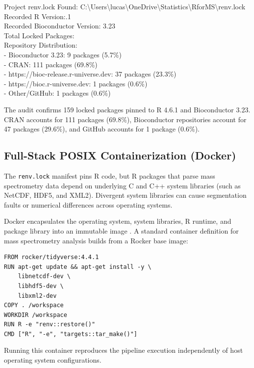 \documentclass[11pt,twoside,openright]{book}
\begin{document}
\begin{routput}
Project renv.lock Found: C:\textbackslash Users\textbackslash lucas\textbackslash OneDrive\textbackslash Statistics\textbackslash RforMS\textbackslash renv.lock\\
\enspace\enspace Recorded R Version:\enspace\enspace\enspace\enspace\enspace\enspace\enspace\enspace\enspace\enspace\enspace{}.1\\
\enspace\enspace Recorded Bioconductor Version: 3.23\\
\enspace\enspace Total Locked Packages:\enspace\enspace\enspace\enspace\enspace\enspace\enspace\enspace{}\\
\enspace\enspace Repository Distribution:\\
\enspace\enspace\enspace\enspace - Bioconductor 3.23: 9 packages (5.7\%)\\
\enspace\enspace\enspace\enspace - CRAN: 111 packages (69.8\%)\\
\enspace\enspace\enspace\enspace - https://bioc-release.r-universe.dev: 37 packages (23.3\%)\\
\enspace\enspace\enspace\enspace - https://bioc.r-universe.dev: 1 packages (0.6\%)\\
\enspace\enspace\enspace\enspace - Other/GitHub: 1 packages (0.6\%)
\end{routput}

The audit confirms 159 locked packages pinned to R 4.6.1 and Bioconductor 3.23. CRAN accounts for 111 packages ($69.8\%$), Bioconductor repositories account for 47 packages ($29.6\%$), and GitHub accounts for 1 package ($0.6\%$).

\subsection{Full-Stack POSIX Containerization (Docker)}

The \texttt{renv.lock} manifest pins R code, but R packages that parse mass spectrometry data depend on underlying C and C++ system libraries (such as NetCDF, HDF5, and XML2). Divergent system libraries can cause segmentation faults or numerical differences across operating systems.

Docker encapsulates the operating system, system libraries, R runtime, and package library into an immutable image \cite{boettiger2015docker, nust2020ten}. A standard container definition for mass spectrometry analysis builds from a Rocker base image:
\begin{verbatim}
FROM rocker/tidyverse:4.4.1
RUN apt-get update && apt-get install -y \
    libnetcdf-dev \
    libhdf5-dev \
    libxml2-dev
COPY . /workspace
WORKDIR /workspace
RUN R -e "renv::restore()"
CMD ["R", "-e", "targets::tar_make()"]
\end{verbatim}
Running this container reproduces the pipeline execution independently of host operating system configurations.
\end{document}
